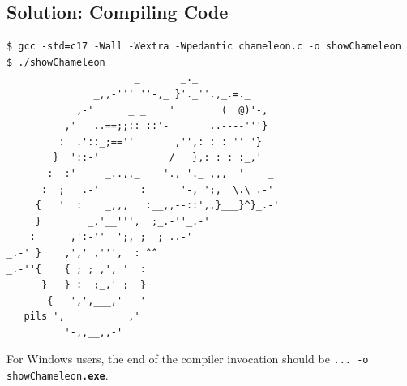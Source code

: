 \subsection*{Solution: Compiling Code}
\begin{cmdbox}
\begin{verbatim}
$ gcc -std=c17 -Wall -Wextra -Wpedantic chameleon.c -o showChameleon
$ ./showChameleon
                      _       _._
               _,,-''' ''-,_ }'._''.,_.=._
            ,-'      _ _    '        (  @)'-,
          ,'  _..==;;::_::'-     __..----'''}
         :  .'::_;==''       ,'',: : : '' '}
        }  '::-'            /   },: : : :_,'
       :  :'     _..,,_    '., '._-,,,--'    _
      :  ;   .-'       :      '-, ';,__\.\_.-'
     {   '  :    _,,,   :__,,--::',,}___}^}_.-'
     }        _,'__''',  ;_.-''_.-'
    :      ,':-''  ';, ;  ;_..-'
_.-' }    ,',' ,''',  : ^^
_.-''{    { ; ; ,', '  :
      }   } :  ;_,' ;  }
       {   ',',___,'   '
   pils ',           ,'
          '-,,__,,-'
\end{verbatim}
\end{cmdbox}

For Windows users, the end of the compiler invocation should be \texttt{... -o showChameleon\textbf{.exe}}.